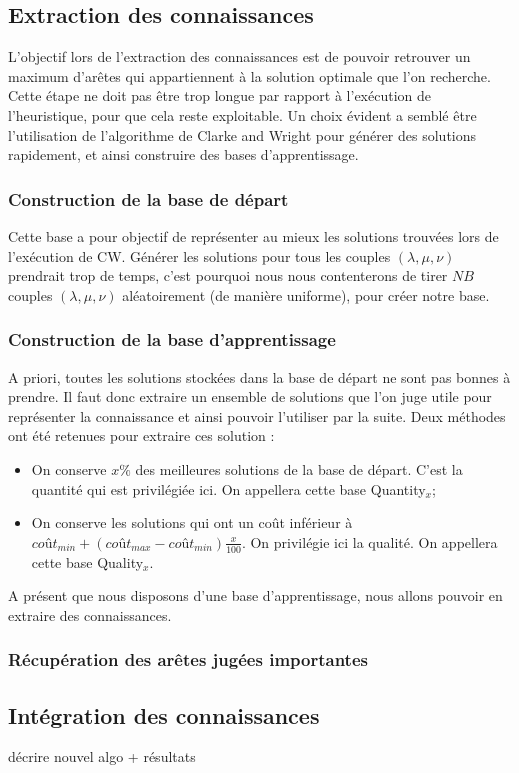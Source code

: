\documentclass[a4paper,11pt]{article}%
\begin{document}
\subsection{Extraction des connaissances}
L'objectif lors de l'extraction des connaissances est de pouvoir retrouver un maximum d'arêtes qui appartiennent à la solution optimale que l'on recherche. 
Cette étape ne doit pas être trop longue par rapport à l'exécution de l'heuristique, pour que cela reste exploitable.
Un choix évident a semblé être l'utilisation de l'algorithme de Clarke and Wright pour générer des solutions rapidement, et ainsi construire des bases d'apprentissage.

\subsubsection{Construction de la base de départ}
Cette base a pour objectif de représenter au mieux les solutions trouvées lors de l'exécution de CW. 
Générer les solutions pour tous les couples $(\lambda,\mu,\nu)$ prendrait trop de temps, c'est pourquoi nous nous contenterons de tirer $NB$ couples $(\lambda,\mu,\nu)$ aléatoirement (de manière uniforme), pour créer notre base.

\subsubsection{Construction de la base d'apprentissage}
A priori, toutes les solutions stockées dans la base de départ ne sont pas bonnes à prendre. 
Il faut donc extraire un ensemble de solutions que l'on juge utile pour représenter la connaissance et ainsi pouvoir l'utiliser par la suite.
Deux méthodes ont été retenues pour extraire ces solution :
\begin{itemize}
\item On conserve $x\%$ des meilleures solutions de la base de départ. C'est la quantité qui est privilégiée ici. On appellera cette base Quantity$_x$;
\item On conserve les solutions qui ont un coût inférieur à $coût_{min} + (coût_{max}-coût_{min})\frac{x}{100}$. On privilégie ici la qualité. On appellera cette base Quality$_x$.
\end{itemize}

A présent que nous disposons d'une base d'apprentissage, nous allons pouvoir en extraire des connaissances.

\subsubsection{Récupération des arêtes jugées importantes}
 
\subsection{Intégration des connaissances}
décrire nouvel algo + résultats




\end{document}
